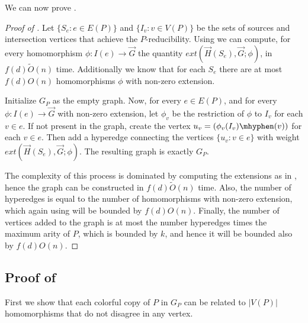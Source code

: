 \documentclass[a4paper,UKenglish,cleveref, autoref, numberwithinsect, thm-restate]{lipics-v2021}
\newcommand{\reduced}[1]{G_{#1}}
\newcommand{\maxoutdeg}{d}
\newcommand{\extension}[3]{ext\left(#1,#2;#3\right)}
\begin{document}
	We can now prove .
	
	\construct*
	\begin{proof}[Proof of ]
		Let $\{S_e : e\in E(P)\}$ and $\{I_v : v\in V(P)\}$ be the sets of sources and intersection vertices that achieve the $P$-reducibility. Using  we can compute, for every homomorphism $\phi: I(e) \to \vec{G}$ the quantity $\extension{\vec{H}(S_e)}{\vec{G}}{\phi}$, in $f(\maxoutdeg)\tilde{O}(n)$ time. Additionally we know that for each $S_e$ there are at most $f(\maxoutdeg)O(n)$ homomorphisms $\phi$ with non-zero extension.
		
		Initialize $\reduced{P}$ as the empty graph. Now, for every $e\in E(P)$, and for every $\phi: I(e) \to \vec{G}$ with non-zero extension, let $\phi_v$ be the restriction of $\phi$ to $I_v$ for each $v \in e$. If not present in the graph, create the vertex $u_v = (\phi_v(I_v)\mhyphen(v))$ for each $v \in e$. Then add a hyperedge connecting the vertices $\{ u_v : v \in e\}$ with weight $\extension{\vec{H}(S_e)}{\vec{G}}{\phi}$. The resulting graph is exactly $\reduced{P}$.
		
		The complexity of this process is dominated by computing the extensions as in , hence the graph can be constructed in $f(\maxoutdeg)\tilde{O}(n)$ time. Also, the number of hyperedges is equal to the number of homomorphisms with non-zero extension, which again using  will be bounded by $f(\maxoutdeg)O(n)$. Finally, the number of vertices added to the graph is at most the number hyperedges times the maximum arity of $P$, which is bounded by $k$, and hence it will be bounded also by $f(\maxoutdeg)O(n)$.
	\end{proof}

	\subsection{Proof of }
	First we show that each colorful copy of $P$ in $\reduced{P}$ can be related to $|V(P)|$ homomorphisms that do not disagree in any vertex.
	
\end{document}
